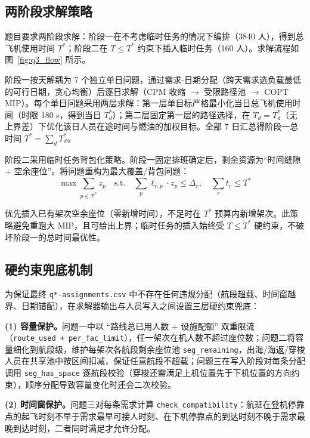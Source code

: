 \subsection{两阶段求解策略}

题目要求两阶段求解：阶段一在不考虑临时任务的情况下编排（3840 人），得到总飞机使用时间 $T^*$；阶段二在 $T \leq T^*$ 约束下插入临时任务（160 人）。求解流程如图~\ref{fig:q3_flow} 所示。



阶段一按天解耦为 7 个独立单日问题，通过需求-日期分配（跨天需求选负载最低的可行日期，贪心均衡）后逐日求解（CPM 收缩 $\to$ 受限路径池 $\to$ COPT MIP）。每个单日问题采用两层求解：第一层单目标严格最小化当日总飞机使用时间（时限 180 s，得到当日 $T^*_d$）；第二层固定第一层的路径选择，在 $T_d = T^*_d$（无上界差）下优化该日人员在途时间与燃油的加权目标。全部 7 日汇总得阶段一总时间 $T^* = \sum_d T^*_d$。

阶段二采用临时任务背包化策略。阶段一固定排班确定后，剩余资源为``时间缝隙 + 空余座位''。将问题重构为最大覆盖/背包问题：
\begin{equation}
\max \sum_{p \in \mathcal{P}^{*}} z_p \quad \text{s.t.} \quad \sum_{p} \ell_{r,p} \cdot z_p \leq \Delta_r, \quad \sum_r t_r \leq T^*
\label{eq:q3_knapsack}
\end{equation}

优先插入已有架次空余座位（零新增时间），不足时在 $T^*$ 预算内新增架次。此策略避免重跑大 MIP，且可给出上界；临时任务的插入始终受 $T \le T^*$ 硬约束，不破坏阶段一的总时间最优性。

\subsection{硬约束兜底机制}

为保证最终 \texttt{q*-assignments.csv} 中不存在任何违规分配（航段超载、时间窗越界、日期错配），在求解器输出与人员写入之间设置三层硬约束兜底：

\textbf{(1) 容量保护。}问题一中以 ``路线总已用人数 + 设施配额'' 双重限流（\texttt{route\_used + per\_fac\_limit}），任一架次在机人数不超过座位数；问题二将容量细化到航段级，维护每架次各航段剩余座位池 \texttt{seg\_remaining}，出海/海返/穿梭人员在共享池中按区间扣减，保证任意航段不超载；问题三在写入阶段对每条分配调用 \texttt{seg\_has\_space} 逐航段校验（穿梭还需满足上机位置先于下机位置的方向约束），顺序分配导致容量变化时还会二次校验。

\textbf{(2) 时间窗保护。}问题三对每条需求计算 \texttt{check\_compatibility}：航班在登机停靠点的起飞时刻不早于需求最早可接人时刻、在下机停靠点的到达时刻不晚于需求最晚到达时刻，二者同时满足才允许分配。

